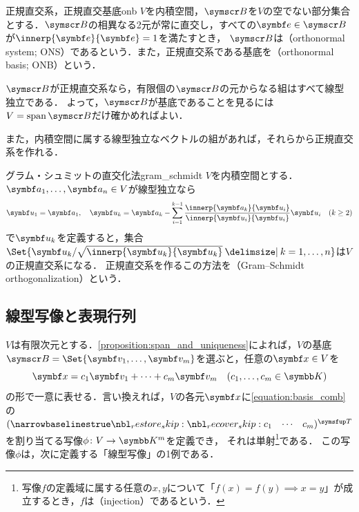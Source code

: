 \documentclass[../../main]{subfiles}
\begin{document}
\begin{definition}{正規直交系，正規直交基底}{onb}
  \(V\)を内積空間，\(\basis{B}\)を\(V\)の空でない部分集合とする．\(\basis{B}\)の相異なる2元が常に直交し，すべての\(\vect{e}\in\basis{B}\)が\(\innerp{\vect{e}}{\vect{e}}=1\)を満たすとき，
  \(\basis{B}\)は（orthonormal system; ONS）であるという．また，正規直交系である基底を（orthonormal basis; ONB）という．
\end{definition}

\(\basis{B}\)が正規直交系なら，有限個の\(\basis{B}\)の元からなる組はすべて線型独立である．
よって，\(\basis{B}\)が基底であることを見るには\(V=\spannedby\basis{B}\)だけ確かめればよい．

また，内積空間に属する線型独立なベクトルの組があれば，それらから正規直交系を作れる．

\begin{proposition}{グラム・シュミットの直交化法}{gram_schmidt}
  \(V\)を内積空間とする．\(\vect{a}_1,\dots,\vect{a}_n\in V\)が線型独立なら
  \[
    \vect{u}_1 = \vect{a}_1,
    \quad\vect{u}_k = \vect{a}_k-\sum_{i=1}^{k-1}\frac{\innerp{\vect{a}_k}{\vect{u}_i}}{\innerp{\vect{u}_i}{\vect{u}_i}}\vect{u}_i\quad(k\geq 2)
  \]
  で\(\vect{u}_k\)を定義すると，集合\(\Set{\vect{u}_k/\sqrt{\innerp{\vect{u}_k}{\vect{u}_k}}\given k=1,\dots,n}\)は\(V\)の正規直交系になる．
  正規直交系を作るこの方法を（Gram–Schmidt orthogonalization）という．
\end{proposition}

\subsection{線型写像と表現行列}
\label{subsection:representation_matrix}

\(V\)は有限次元とする．\cref{proposition:span_and_uniqueness}によれば，\(V\)の基底\(\basis{B}=\Set{\vect{v}_1,\dots,\vect{v}_m}\)を選ぶと，任意の\(\vect{x}\in V\)を
\begin{equation}
  \label{equation:basis_comb}
  \vect{x} = c_1\vect{v}_1+\dots+c_m\vect{v}_m\quad(c_1,\dots,c_m\in\numset{K})
\end{equation}
の形で一意に表せる．言い換えれば，\(V\)の各元\(\vect{x}\)に\cref{equation:basis_comb}の\(\trps{\rowvect{c_1 & \cdots & c_m}}\)を割り当てる写像\(\phi\colon V\to\numset{K}^m\)を定義でき，
それは単射\footnote{写像\(f\)の定義域に属する任意の\(x,y\)について「\(f(x)=f(y)\implies x=y\)」が成立するとき，\(f\)は（injection）であるという．}である．
この写像\(\phi\)は，次に定義する「線型写像」の1例である．
\end{document}
